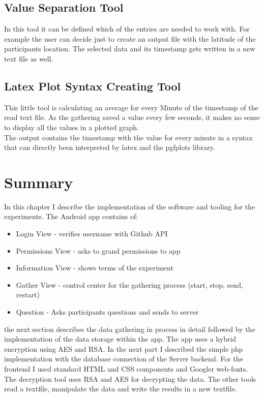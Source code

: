 \subsection{Value Separation  Tool}
In this tool it can be defined which of the entries are needed to work with. For example the user can decide just to create an output file with the latitude of the participants location. The selected data and its timestamp gets written in a new text file as well. 

\subsection{Latex Plot Syntax Creating Tool}
This little tool is calculating an average for every Minute of the timestamp of the read text file. As the gathering saved a value every few seconds, it makes no sense to display all the values in a plotted graph.\\
The output contains the timestamp with the value for every minute in a syntax that can directly been interpreted by latex and the pgfplots library. 

\section{Summary}
In this chapter I describe the implementation of the software and tooling for the experiments. 
The Android app contains of:\\
\begin{itemize}
\item Login View - verifies username with Github API
\item Permissions View - asks to grand permissions to app
\item Information View - shows terms of the experiment
\item Gather View - control center for the gathering process (start, stop, send, restart)
\item Question - Asks participants questions and sends to server
\end{itemize}
the next section describes the data gathering in process in detail followed by the implementation of the data storage within the app. The app uses a hybrid encryption using AES and RSA. 
\bigbreak
In the next part I described the simple php implementation with the database connection of the Server backend. For the frontend I used standard HTML and CSS components and Googler web-fonts.
The decryption tool uses RSA and AES for decrypting the data. The other tools read a textfile, manipulate the data and write the results in a new textfile.  
